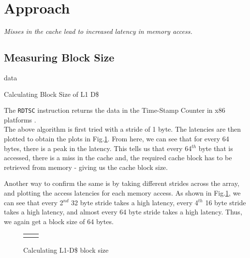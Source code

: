 \documentclass[12pt,a4paper,english]{paper}
\newenvironment{results}{%
  \def\FrameCommand{%
    \hspace{1pt}%
    {\color{blue}\vrule width 2pt}%
    {\color{formalblue}\vrule width 4pt}%
    \colorbox{formalblue}%
  }%
  \MakeFramed{\advance\hsize-\width\FrameRestore}%
  \noindent\hspace{-4.55pt}%
  \begin{adjustwidth}{7pt}{}%
  \vspace{2pt}\vspace{2pt}%
}
{%
  \vspace{2pt}\end{adjustwidth}\endMakeFramed%
}
\begin{document}
\section{Approach}
\begin{results}
    \textsl{Misses in the cache lead to increased latency in memory access.}
\end{results}

\subsection{Measuring Block Size}
\begin{algorithm}[H]
\SetAlgoLined
{}
 
     \plot data\;
 \caption{Calculating Block Size of L1 D\$}
\end{algorithm}

The \texttt{RDTSC} instruction returns the data in the Time-Stamp Counter in x86 platforms \cite{intel_2021}.\\

The above algorithm is first tried with a stride of 1 byte. The latencies are then plotted to obtain the plots in Fig.\ref{Fig:blockSize}. From here, we can see that for every 64 bytes, there is a peak in the latency. This tells us that every 64$^{th}$ byte that is accessed, there is a miss in the cache and, the required cache block has to be retrieved from memory - giving us the cache block size.

Another way to confirm the same is by taking different strides across the array, and plotting the access latencies for each memory access. As shown in Fig.\ref{Fig:blockSize}, we can see that every 2$^{nd}$ 32 byte stride takes a high latency, every 4$^{th}$ 16 byte stride takes a high latency, and almost every 64 byte stride takes a high latency. Thus, we again get a block size of 64 bytes.

\begin{figure}[H]
    \centering
    \setlength\tabcolsep{1pt}
    \begin{tabular}{cc}
        \def\svgwidth{0.5\columnwidth}
        &
        \def\svgwidth{0.5\columnwidth}
        
    \end{tabular}
    \caption{Calculating L1-D\$ block size}
    \label{Fig:blockSize}
\end{figure}
\end{document}
